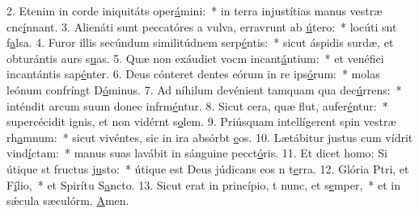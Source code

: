 2. Etenim in corde iniquitáts oper\uline{á}mini:~* in terra injustítias manus vestræ cnc\uline{í}nnant.
3. Alienáti sunt peccatóres a vulva, erravrunt ab \uline{ú}tero:~* locúti snt f\uline{a}lsa.
4. Furor illis secúndum similitúdnem serp\uline{é}ntis:~* sicut áspidis surdæ, et obturántis aurs s\uline{u}as.
5. Quæ non exáudiet vocm incant\uline{á}ntium:~* et venéfici incantántis sap\uline{é}nter.
6. Deus cónteret dentes eórum in re ips\uline{ó}rum:~* molas leónum confríngt D\uline{ó}minus.
7. Ad níhilum devénient tamquam qua dec\uline{ú}rrens:~* inténdit arcum suum donec infrm\uline{é}ntur.
8. Sicut cera, quæ flut, aufer\uline{é}ntur:~* supercécidit ignis, et non vidérnt s\uline{o}lem.
9. Priúsquam intellígerent spin vestræ rh\uline{a}mnum:~* sicut vivéntes, sic in ira absórbt \uline{e}os.
10. Lætábitur justus cum vídrit vind\uline{í}ctam:~* manus suas lavábit in sánguine pecct\uline{ó}ris.
11. Et dicet homo: Si útique st fructus j\uline{u}sto:~* útique est Deus júdicans eos n t\uline{e}rra.
12. Glória Ptri, et F\uline{í}lio,~* et Spirítu S\uline{a}ncto.
13. Sicut erat in princípio, t nunc, et s\uline{e}mper,~* et in sǽcula sæculórm. \uline{A}men.
